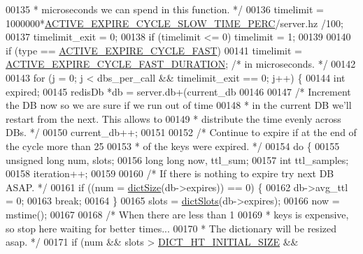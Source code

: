\begin{DoxyCode}
00135 \textcolor{comment}{     * microseconds we can spend in this function. */}
00136     timelimit = 1000000*\hyperlink{server_8h_ac934cb3813b44558144bd1560cc1645a}{ACTIVE\_EXPIRE\_CYCLE\_SLOW\_TIME\_PERC}/server.hz
      /100;
00137     timelimit\_exit = 0;
00138     \textcolor{keywordflow}{if} (timelimit <= 0) timelimit = 1;
00139 
00140     \textcolor{keywordflow}{if} (type == \hyperlink{server_8h_ae265e849da28d7e7793659e45579ee11}{ACTIVE\_EXPIRE\_CYCLE\_FAST})
00141         timelimit = \hyperlink{server_8h_a2bf59f8f4da1fa65543af877d632ad63}{ACTIVE\_EXPIRE\_CYCLE\_FAST\_DURATION}; \textcolor{comment}{/* in
       microseconds. */}
00142 
00143     \textcolor{keywordflow}{for} (j = 0; j < dbs\_per\_call && timelimit\_exit == 0; j++) \{
00144         \textcolor{keywordtype}{int} expired;
00145         redisDb *db = server.db+(current\_db %
00146 
00147         \textcolor{comment}{/* Increment the DB now so we are sure if we run out of time}
00148 \textcolor{comment}{         * in the current DB we'll restart from the next. This allows to}
00149 \textcolor{comment}{         * distribute the time evenly across DBs. */}
00150         current\_db++;
00151 
00152         \textcolor{comment}{/* Continue to expire if at the end of the cycle more than 25%
00153 \textcolor{comment}{         * of the keys were expired. */}
00154         \textcolor{keywordflow}{do} \{
00155             \textcolor{keywordtype}{unsigned} \textcolor{keywordtype}{long} num, slots;
00156             \textcolor{keywordtype}{long} \textcolor{keywordtype}{long} now, ttl\_sum;
00157             \textcolor{keywordtype}{int} ttl\_samples;
00158             iteration++;
00159 
00160             \textcolor{comment}{/* If there is nothing to expire try next DB ASAP. */}
00161             \textcolor{keywordflow}{if} ((num = \hyperlink{dict_8h_af193430dd3d5579a52b194512f72c1f0}{dictSize}(db->expires)) == 0) \{
00162                 db->avg\_ttl = 0;
00163                 \textcolor{keywordflow}{break};
00164             \}
00165             slots = \hyperlink{dict_8h_aca9596be4bcc2caa07c17dd8cebcceec}{dictSlots}(db->expires);
00166             now = mstime();
00167 
00168             \textcolor{comment}{/* When there are less than 1%
00169 \textcolor{comment}{             * keys is expensive, so stop here waiting for better times...}
00170 \textcolor{comment}{             * The dictionary will be resized asap. */}
00171             \textcolor{keywordflow}{if} (num && slots > \hyperlink{dict_8h_aff97c19d1616cf2c697573ee3f515692}{DICT\_HT\_INITIAL\_SIZE} &&
}}
\end{DoxyCode}
